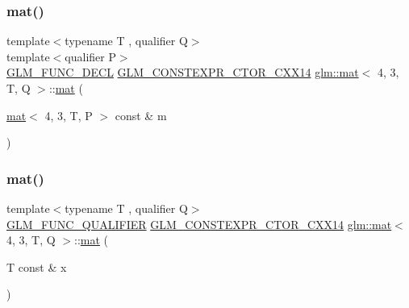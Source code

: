 \subsubsection{\texorpdfstring{mat()}{mat()}\hspace{0.1cm}{\footnotesize\ttfamily [3/21]}}
{\footnotesize\ttfamily template$<$typename T , qualifier Q$>$ \\
template$<$qualifier P$>$ \\
\hyperlink{setup_8hpp_ab2d052de21a70539923e9bcbf6e83a51}{G\+L\+M\+\_\+\+F\+U\+N\+C\+\_\+\+D\+E\+CL} \hyperlink{setup_8hpp_a0900f9145e68bf6061b6f5e7be3fa751}{G\+L\+M\+\_\+\+C\+O\+N\+S\+T\+E\+X\+P\+R\+\_\+\+C\+T\+O\+R\+\_\+\+C\+X\+X14} \hyperlink{structglm_1_1mat}{glm\+::mat}$<$ 4, 3, T, Q $>$\+::\hyperlink{structglm_1_1mat}{mat} (\begin{DoxyParamCaption}\item[{\hyperlink{structglm_1_1mat}{mat}$<$ 4, 3, T, P $>$ const \&}]{m }\end{DoxyParamCaption})}

\mbox{\label{structglm_1_1mat_3_014_00_013_00_01_t_00_01_q_01_4_a6a797b407bea1827cf196545f04fb6ca}} 
\subsubsection{\texorpdfstring{mat()}{mat()}\hspace{0.1cm}{\footnotesize\ttfamily [4/21]}}
{\footnotesize\ttfamily template$<$typename T , qualifier Q$>$ \\
\hyperlink{setup_8hpp_a33fdea6f91c5f834105f7415e2a64407}{G\+L\+M\+\_\+\+F\+U\+N\+C\+\_\+\+Q\+U\+A\+L\+I\+F\+I\+ER} \hyperlink{setup_8hpp_a0900f9145e68bf6061b6f5e7be3fa751}{G\+L\+M\+\_\+\+C\+O\+N\+S\+T\+E\+X\+P\+R\+\_\+\+C\+T\+O\+R\+\_\+\+C\+X\+X14} \hyperlink{structglm_1_1mat}{glm\+::mat}$<$ 4, 3, T, Q $>$\+::\hyperlink{structglm_1_1mat}{mat} (\begin{DoxyParamCaption}\item[{T const \&}]{x }\end{DoxyParamCaption})\hspace{0.3cm}{\ttfamily [explicit]}}

\mbox{\label{structglm_1_1mat_3_014_00_013_00_01_t_00_01_q_01_4_a2bb46396e51e502b05ba91e5a3602e04}} 
